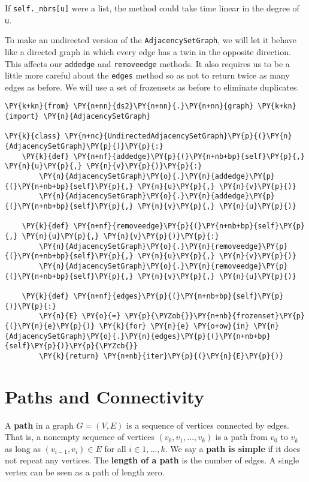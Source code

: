 If \texttt{self.\_nbrs[u]} were a list, the method could take time linear in the degree of \texttt{u}.


To make an undirected version of the \texttt{AdjacencySetGraph}, we will let it behave like a directed graph in which every edge has a twin in the opposite direction.
This affects our \texttt{addedge} and \texttt{removeedge} methods.
It also requires us to be a little more careful about the \texttt{edges} method so as not to return twice as many edges as before.
We will use a set of frozensets as before to eliminate duplicates.

\begin{Verbatim}[commandchars=\\\{\}]
\PY{k+kn}{from} \PY{n+nn}{ds2}\PY{n+nn}{.}\PY{n+nn}{graph} \PY{k+kn}{import} \PY{n}{AdjacencySetGraph}

\PY{k}{class} \PY{n+nc}{UndirectedAdjacencySetGraph}\PY{p}{(}\PY{n}{AdjacencySetGraph}\PY{p}{)}\PY{p}{:}
    \PY{k}{def} \PY{n+nf}{addedge}\PY{p}{(}\PY{n+nb+bp}{self}\PY{p}{,} \PY{n}{u}\PY{p}{,} \PY{n}{v}\PY{p}{)}\PY{p}{:}
        \PY{n}{AdjacencySetGraph}\PY{o}{.}\PY{n}{addedge}\PY{p}{(}\PY{n+nb+bp}{self}\PY{p}{,} \PY{n}{u}\PY{p}{,} \PY{n}{v}\PY{p}{)}
        \PY{n}{AdjacencySetGraph}\PY{o}{.}\PY{n}{addedge}\PY{p}{(}\PY{n+nb+bp}{self}\PY{p}{,} \PY{n}{v}\PY{p}{,} \PY{n}{u}\PY{p}{)}

    \PY{k}{def} \PY{n+nf}{removeedge}\PY{p}{(}\PY{n+nb+bp}{self}\PY{p}{,} \PY{n}{u}\PY{p}{,} \PY{n}{v}\PY{p}{)}\PY{p}{:}
        \PY{n}{AdjacencySetGraph}\PY{o}{.}\PY{n}{removeedge}\PY{p}{(}\PY{n+nb+bp}{self}\PY{p}{,} \PY{n}{u}\PY{p}{,} \PY{n}{v}\PY{p}{)}
        \PY{n}{AdjacencySetGraph}\PY{o}{.}\PY{n}{removeedge}\PY{p}{(}\PY{n+nb+bp}{self}\PY{p}{,} \PY{n}{v}\PY{p}{,} \PY{n}{u}\PY{p}{)}

    \PY{k}{def} \PY{n+nf}{edges}\PY{p}{(}\PY{n+nb+bp}{self}\PY{p}{)}\PY{p}{:}
        \PY{n}{E} \PY{o}{=} \PY{p}{\PYZob{}}\PY{n+nb}{frozenset}\PY{p}{(}\PY{n}{e}\PY{p}{)} \PY{k}{for} \PY{n}{e} \PY{o+ow}{in} \PY{n}{AdjacencySetGraph}\PY{o}{.}\PY{n}{edges}\PY{p}{(}\PY{n+nb+bp}{self}\PY{p}{)}\PY{p}{\PYZcb{}}
        \PY{k}{return} \PY{n+nb}{iter}\PY{p}{(}\PY{n}{E}\PY{p}{)}
\end{Verbatim}


\section{Paths and Connectivity}


A \textbf{path} in a graph $G = (V,E)$ is a sequence of vertices connected by edges.
That is, a nonempty sequence of vertices $(v_0, v_1,\ldots, v_k)$ is a path from $v_0$ to $v_k$ as long as $(v_{i-1}, v_i)\in E$ for all $i \in {1,\ldots, k}$.
We say a \textbf{path is simple} if it does not repeat any vertices.
The \textbf{length of a path} is the number of edges.
A single vertex can be seen as a path of length zero.



